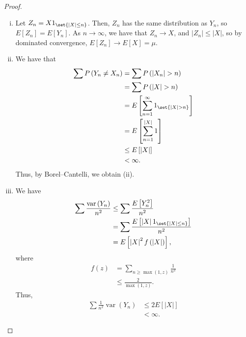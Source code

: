 \documentclass[10pt]{mypackage}
\begin{document}
\begin{proof}\hfill
  \begin{enumerate}[(i)]
    \item Let $Z_n = X1_{\set{\left\vert X \right\vert\leq n}}$. Then, $Z_n$ has the same distribution as $Y_n$, so $E\left[ Z_n \right] = E\left[ Y_n \right]$. As $n\to\infty$, we have that $Z_n\to X$, and $\left\vert Z_n \right\vert\leq \left\vert X \right\vert$, so by dominated convergence, $E\left[ Z_n \right]\to E\left[ X \right] = \mu$.
    \item We have that
      \begin{align*}
        \sum P\left( Y_n\neq X_n \right) &= \sum P\left( \left\vert X_n \right\vert > n \right)\\
                                         &= \sum P\left( \left\vert X \right\vert > n \right)\\
                                         &= E\left[ \sum_{n=1}^{\infty}1_{\set{\left\vert X \right\vert > n}} \right]\\
                                         &= E\left[ \sum_{n=1}^{\left\vert X \right\vert}1 \right]\\
                                         &\leq E\left[ \left\vert X \right\vert \right]\\
                                         &< \infty.
      \end{align*}
      Thus, by Borel--Cantelli, we obtain (ii).
    \item We have
      \begin{align*}
        \sum \frac{\operatorname{var}\left( Y_n \right)}{n^2} &\leq \sum \frac{E\left[ Y_n^2 \right]}{n^2}\\
                                                              &= \sum \frac{E\left[ \left\vert X \right\vert 1_{\set{\left\vert X \right\vert\leq n}} \right]}{n^2}\\
                                                              &= E\left[ \left\vert X \right\vert^2 f\left( \left\vert X \right\vert \right) \right],
      \end{align*}
      where
      \begin{align*}
        f(z) &= \sum_{n\geq \max\left( 1,z \right)} \frac{1}{n^2}\\
             &\leq \frac{2}{\max\left( 1,z \right)}.
      \end{align*}
      Thus,
      \begin{align*}
        \sum \frac{1}{n^2}\operatorname{var}\left( Y_n \right) &\leq 2E\left[ \left\vert X \right\vert \right]\\
                                                               &< \infty.
      \end{align*}
  \end{enumerate}
\end{proof}
\end{document}
